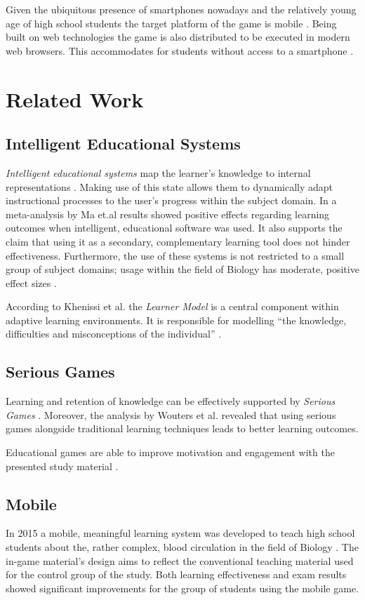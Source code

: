 Given the ubiquitous presence of smartphones nowadays and the relatively young age of high school students the target platform of the game is mobile \cite{Harris2013PearsonStudents}. Being built on web technologies the game is also distributed to be executed in modern web browsers. This accommodates for students without access to a smartphone \cite{Lenhart2015TeensTeens}.

\section{Related Work}
\subsection{Intelligent Educational Systems}
\textit{Intelligent educational systems} map the learner's knowledge to internal representations \cite{Ma2014}. Making use of this state allows them to dynamically adapt instructional processes to the user's progress within the subject domain. In a meta-analysis by Ma et.al \cite{Ma2014} results showed positive effects regarding learning outcomes when intelligent, educational software was used. It also supports the claim that using it as a secondary, complementary learning tool does not hinder effectiveness. Furthermore, the use of these systems is not restricted to a small group of subject domains; usage within the field of Biology has moderate, positive effect sizes \cite{Ma2014}.

According to Khenissi et al. \cite{Khenissi2015} the \textit{Learner Model} is a central component within adaptive learning environments. It is responsible for modelling \enquote{the knowledge, difficulties and misconceptions of the individual} \cite{Bull2013OpenProcesses}.

\subsection{Serious Games}
Learning and retention of knowledge can be effectively supported by \textit{Serious Games} \cite{Wouters2013}. Moreover, the analysis by Wouters et al. \cite{Wouters2013} revealed that using serious games alongside traditional learning techniques leads to better learning outcomes.

Educational games are able to improve motivation and engagement with the presented study material \cite{Khenissi2015}.

\subsection{Mobile}
In 2015 a mobile, meaningful learning system was developed to teach high school students about the, rather complex, blood circulation in the field of Biology \cite{Fan2015TheCurriculum}. The in-game material's design aims to reflect the conventional teaching material used for the control group of the study. Both learning effectiveness and exam results showed significant improvements for the group of students using the mobile game.

